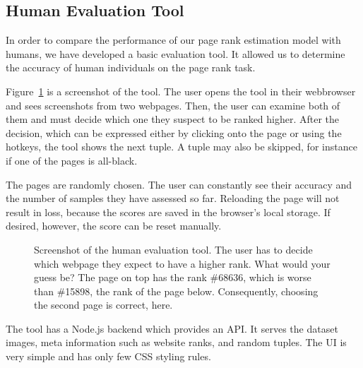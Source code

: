 \subsection{Human Evaluation Tool}
\label{sec:humanevaltool}

In order to compare the performance of our page rank estimation model with humans, we have developed a basic evaluation tool. It allowed us to determine the accuracy of human individuals on the page rank task.

Figure~\ref{fig:humanevalscreenshot} is a screenshot of the tool. The user opens the tool in their webbrowser and sees screenshots from two webpages. Then, the user can examine both of them and must decide which one they suspect to be ranked higher. After the decision, which can be expressed either by clicking onto the page or using the hotkeys, the tool shows the next tuple. A tuple may also be skipped, for instance if one of the pages is all-black.

The pages are randomly chosen. The user can constantly see their accuracy and the number of samples they have assessed so far. Reloading the page will not result in loss, because the scores are saved in the browser's local storage. If desired, however, the score can be reset manually.

\begin{figure}\centering
    \caption[Screenshot of the human evaluation tool]{Screenshot of the human evaluation tool. The user has to decide which webpage they expect to have a higher rank. What would your guess be? The page on top has the rank \#68636, which is worse than \#15898, the rank of the page below. Consequently, choosing the second page is correct, here.}\label{fig:humanevalscreenshot}
\end{figure}

The tool has a Node.js backend which provides an API. It serves the dataset images, meta information such as website ranks, and random tuples. The UI is very simple and has only few CSS styling rules.
